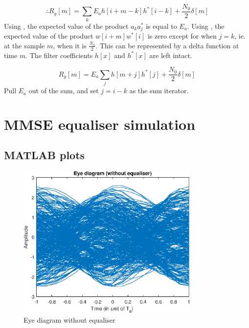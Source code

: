 \documentclass[11pt]{article}
\begin{document}
\begin{equation}
    \therefore R_y[m] = \sum_k E_a h[i+m-k]h^*[i-k]+\frac{N_0}{2}\delta[m]
\end{equation}
Using , the expected value of the product $a_k a_j^*$ is equal
to $E_a$. Using , the expected value of the product $w[i+m]w^*[i]$
is zero except for when $j = k$, ie.  at the sample $m$, when it is
$\frac{N_0}{2}$. This can be represented by a delta function at time $m$. The
filter coefficients $h[x]$ and $h^*[x]$ are left intact.

\begin{equation}
    R_y[m] = E_a \sum_j h[m+j]h^*[j]+\frac{N_0}{2}\delta[m]
\end{equation}
Pull $E_a$ out of the sum, and set $j = i - k$ as the sum iterator.

\section{MMSE equaliser simulation}

\subsection{MATLAB plots}
\begin{figure}[H]
    \centering
    \includegraphics[width=0.8\textwidth]{plots/multipath_eye.eps}
    \caption{Eye diagram without equaliser\label{badeye}}
\end{figure}
\end{document}
